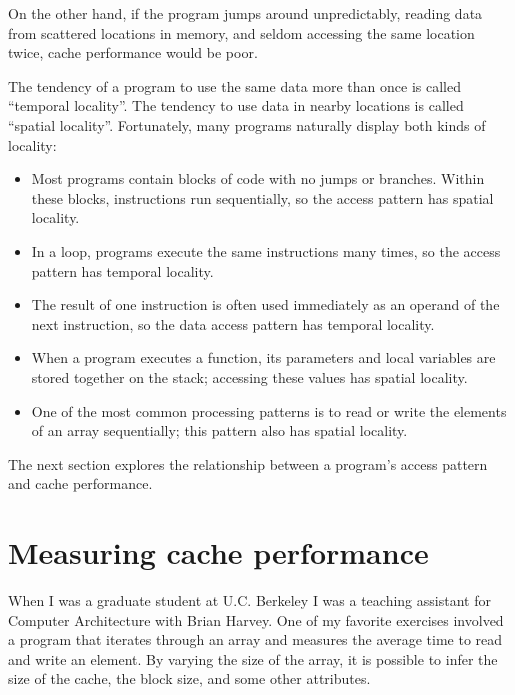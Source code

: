 \documentclass[12pt]{book}
\begin{document}
On the other hand, if the program jumps around unpredictably,
reading data from scattered locations in memory, and seldom
accessing the same location twice, cache performance would be
poor.

The tendency of a program to use the same data more than once is
called ``temporal locality''.  The tendency to use data in nearby
locations is called ``spatial locality''.  Fortunately, many
programs naturally display both kinds of locality:

\begin{itemize}

\item Most programs contain blocks of code with no jumps or
branches.  Within these blocks, instructions run
sequentially, so the access pattern has
spatial locality.

\item In a loop, programs execute the same instructions many
times, so the access pattern has temporal locality.

\item The result of one instruction is often used immediately as
an operand of the next instruction, so the data access pattern
has temporal locality.

\item When a program executes a function, its parameters and local
variables are stored together on the stack; accessing these values
has spatial locality.

\item One of the most common processing patterns is to read or write
the elements of an array sequentially; this pattern also has
spatial locality.

\end{itemize}

The next section explores the relationship
between a program's access pattern and cache performance.


\section{Measuring cache performance}

When I was a graduate student at U.C. Berkeley I was a teaching
assistant for Computer Architecture with Brian Harvey.  One of my
favorite exercises involved a program that iterates through an array
and measures the average time to read and write an element.  By
varying the size of the array, it is possible to infer the size
of the cache, the block size, and some other attributes.
\end{document}
